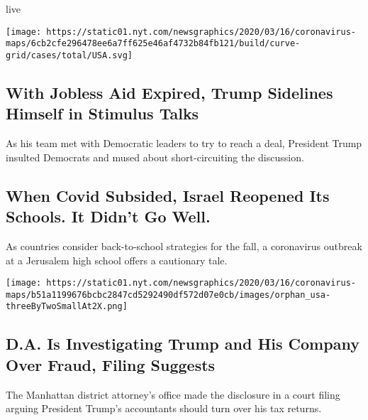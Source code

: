 live

\texttt{[image: https://static01.nyt.com/newsgraphics/2020/03/16/coronavirus-maps/6cb2cfe296478ee6a7ff625e46af4732b84fb121/build/curve-grid/cases/total/USA.svg]}

\href{/2020/08/03/us/politics/congress-jobless-aid-talks-trump.html}{}

\hypertarget{with-jobless-aid-expired-trump-sidelines-himself-in-stimulus-talks}{%
\subsection{With Jobless Aid Expired, Trump Sidelines Himself in
Stimulus
Talks}\label{with-jobless-aid-expired-trump-sidelines-himself-in-stimulus-talks}}

As his team met with Democratic leaders to try to reach a deal,
President Trump insulted Democrats and mused about short-circuiting the
discussion.

\href{/2020/08/04/world/middleeast/coronavirus-israel-schools-reopen.html}{}

\hypertarget{when-covid-subsided-israel-reopened-its-schools-it-didnt-go-well}{%
\subsection{When Covid Subsided, Israel Reopened Its Schools. It Didn't
Go
Well.}\label{when-covid-subsided-israel-reopened-its-schools-it-didnt-go-well}}

As countries consider back-to-school strategies for the fall, a
coronavirus outbreak at a Jerusalem high school offers a cautionary
tale.

\texttt{[image: https://static01.nyt.com/newsgraphics/2020/03/16/coronavirus-maps/b51a1199676bcbc2847cd5292490df572d07e0cb/images/orphan\_usa-threeByTwoSmallAt2X.png]}

\href{/2020/08/03/nyregion/donald-trump-taxes-cyrus-vance.html}{}

\hypertarget{da-is-investigating-trump-and-his-company-over-fraud-filing-suggests}{%
\subsection{D.A. Is Investigating Trump and His Company Over Fraud,
Filing
Suggests}\label{da-is-investigating-trump-and-his-company-over-fraud-filing-suggests}}

The Manhattan district attorney's office made the disclosure in a court
filing arguing President Trump's accountants should turn over his tax
returns.

